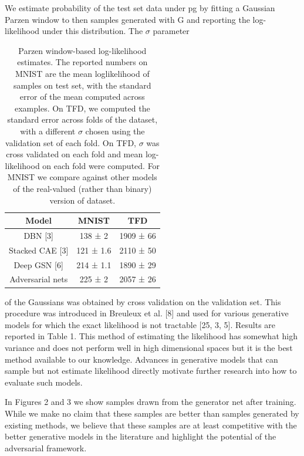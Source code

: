 \documentclass{article}
\begin{document}
\setlength{\parskip}{1em}
\noindent
We estimate probability of the test set data under pg by fitting a Gaussian Parzen 
window to then samples generated with G and reporting the log-likelihood under 
this distribution. The $\sigma$ parameter

\begin{table}[h]
    \centering
    \begin{tabular}{c|c|c} \\
        Model & MNIST & TFD \\ \hline
        DBN [3] & 138 ± 2 & 1909 ± 66 \\  
        Stacked CAE [3] & 121 ± 1.6 & 2110 ± 50 \\
        Deep GSN [6] & 214 ± 1.1 & 1890 ± 29 \\
        Adversarial nets & 225 ± 2 & 2057 ± 26
    \end{tabular}
    \caption{Parzen window-based log-likelihood estimates. The reported numbers on MNIST are 
    the mean loglikelihood of samples on test set, with the standard error of the mean computed 
    across examples. On TFD, we computed the standard error across folds of the dataset,
    with a different $\sigma$ chosen using the validation set of each fold. On TFD, $\sigma$ was
    cross validated on each fold and mean log-likelihood on each fold were computed. For MNIST 
    we compare against other models of the real-valued (rather than binary) 
    version of dataset.}
    \label{tab:my_label}
\end{table}

of the Gaussians was obtained by cross validation on the validation set. This procedure was introduced in Breuleux et al. [8] and used for various generative models for which the exact likelihood
is not tractable [25, 3, 5]. Results are reported in Table 1. This method of estimating the likelihood
has somewhat high variance and does not perform well in high dimensional spaces but it is the best
method available to our knowledge. Advances in generative models that can sample but not estimate
likelihood directly motivate further research into how to evaluate such models.

\setlength{\parskip}{1em}
\noindent
In Figures 2 and 3 we show samples drawn from the generator net after training. While we make no
claim that these samples are better than samples generated by existing methods, we believe that these
samples are at least competitive with the better generative models in the literature and highlight the
potential of the adversarial framework.
\end{document}
